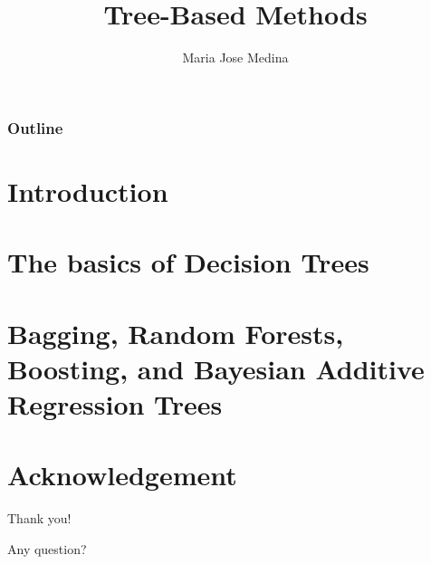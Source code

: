 \documentclass[10pt]{beamer}
\title{Tree-Based Methods}%
\author[Maria Jose Medina]{Maria Jose Medina}%
\institute[USACH]{Universidad de Santiago de Chile}
\date[\textcolor{white}{November 2022}]
\begin{document}
\frame{\titlepage}
\begin{frame}
\frametitle{Outline}
\tableofcontents
\end{frame}



\section{Introduction}


\section{The basics of Decision Trees}


\section{Bagging, Random Forests, Boosting, and Bayesian Additive Regression Trees}


\section*{Acknowledgement}  
\begin{frame}

\textcolor{myNewColorA}{\huge{\centerline{Thank you!}}}
\vspace*{0.5cm}

\textcolor{myNewColorA}{\Large{\centerline{Any question?}}}
\vspace*{0.5cm}


\end{frame}
\end{document}
